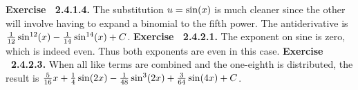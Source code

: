  {\noindent \protect \bf  Exercise ~2.4.1.4.} The substitution $u=\protect \qopname  \relax o{sin}(x)$ is much cleaner since the other will involve having to expand a binomial to the fifth power. The antiderivative is $\protect \frac  {1}{12}\protect \qopname  \relax o{sin}^{12}(x)-\protect \frac  {1}{14}\protect \qopname  \relax o{sin}^{14}(x)+C$. \protect \newline  \protect \newline  
 {\noindent \protect \bf  Exercise ~2.4.2.1.} The exponent on sine is zero, which is indeed even. Thus both exponents are even in this case. \protect \newline  \protect \newline  
 {\noindent \protect \bf  Exercise ~2.4.2.3.} When all like terms are combined and the one-eighth is distributed, the result is $\protect \frac  {5}{16}x+\protect \frac  {1}{4}\protect \qopname  \relax o{sin}(2x)-\protect \frac  {1}{48}\protect \qopname  \relax o{sin}^3(2x)+\protect \frac  {3}{64}\protect \qopname  \relax o{sin}(4x)+C$. \protect \newline  \protect \newline  
